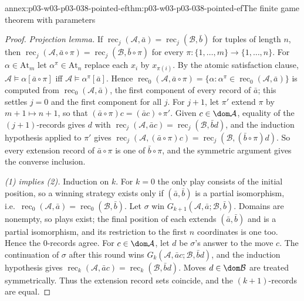 \begin{annexitem}{annex:p03-w03-p03-038-pointed-ef}{thm:p03-w03-p03-038-pointed-ef}{The finite game theorem with parameters}
\begin{proof}
\emph{Projection lemma.} If
\(\operatorname{rec}_j(\mathcal A,\bar a)=\operatorname{rec}_j(\mathcal B,\bar b)\)
for tuples of length \(n\), then
\(\operatorname{rec}_j(\mathcal A,\bar a\circ\pi)=
\operatorname{rec}_j(\mathcal B,\bar b\circ\pi)\) for every
\(\pi:\{1,\ldots,m\}\to\{1,\ldots,n\}\). For \(\alpha\in\mathrm{At}_m\) let
\(\alpha^\pi\in\mathrm{At}_n\) replace each \(x_i\) by \(x_{\pi(i)}\). By the
atomic satisfaction clause,
\(\mathcal A\models\alpha[\bar a\circ\pi]\) iff
\(\mathcal A\models\alpha^\pi[\bar a]\). Hence
\(\operatorname{rec}_0(\mathcal A,\bar a\circ\pi)=
\{\alpha:\alpha^\pi\in\operatorname{rec}_0(\mathcal A,\bar a)\}\) is computed
from \(\operatorname{rec}_0(\mathcal A,\bar a)\), the first component of every
record of \(\bar a\); this settles \(j=0\) and the first component for all
\(j\). For \(j+1\), let \(\pi'\) extend \(\pi\) by \(m+1\mapsto n+1\), so that
\((\bar a\circ\pi)c=(\bar ac)\circ\pi'\). Given \(c\in\dom\mathcal A\), equality
of the \((j+1)\)-records gives \(d\) with
\(\operatorname{rec}_j(\mathcal A,\bar ac)=\operatorname{rec}_j(\mathcal B,\bar bd)\),
and the induction hypothesis applied to \(\pi'\) gives
\(\operatorname{rec}_j(\mathcal A,(\bar a\circ\pi)c)=
\operatorname{rec}_j(\mathcal B,(\bar b\circ\pi)d)\). So every extension record
of \(\bar a\circ\pi\) is one of \(\bar b\circ\pi\), and the symmetric argument
gives the converse inclusion.

\emph{(1) implies (2).} Induction on \(k\). For \(k=0\) the only play
consists of the initial position, so a winning strategy exists only if
\((\bar a,\bar b)\) is a partial isomorphism, i.e.\
\(\operatorname{rec}_0(\mathcal A,\bar a)=\operatorname{rec}_0(\mathcal B,\bar b)\).
Let \(\sigma\) win \(G_{k+1}(\mathcal A,\bar a;\mathcal B,\bar b)\). Domains are
nonempty, so plays exist; the final position of each extends
\((\bar a,\bar b)\) and is a partial isomorphism, and its restriction to the
first \(n\) coordinates is one too. Hence the \(0\)-records agree. For
\(c\in\dom\mathcal A\), let \(d\) be \(\sigma\)'s answer to the move \(c\).
The continuation of \(\sigma\) after this round wins
\(G_k(\mathcal A,\bar ac;\mathcal B,\bar bd)\), and the induction hypothesis
gives \(\operatorname{rec}_k(\mathcal A,\bar ac)=\operatorname{rec}_k(\mathcal B,\bar bd)\).
Moves \(d\in\dom\mathcal B\) are treated symmetrically. Thus the extension
record sets coincide, and the \((k+1)\)-records are equal.


\end{proof}
\end{annexitem}
